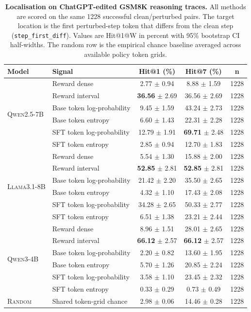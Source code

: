\begin{table}[t]
\centering
\small
\setlength{\tabcolsep}{5pt}
\caption{\textbf{Localisation on ChatGPT-edited GSM8K reasoning traces.} All methods are scored on the same 1228 successful clean/perturbed pairs. The target location is the first perturbed-step token that differs from the clean step (\texttt{step\_first\_diff}). Values are Hit@1@W in percent with 95\% bootstrap CI half-widths. The random row is the empirical chance baseline averaged across available policy token grids.}
\label{tab:localisation_chatgpt_step_combined_hit1_hit7}
\begin{tabular}{llccc}
\toprule
\textbf{Model} & \textbf{Signal} & \textbf{Hit@1 (\%)} & \textbf{Hit@7 (\%)} & \textbf{n} \\
\midrule
\multirow{6}{*}{\textsc{Qwen2.5-7B}} & Reward dense & 2.77 $\pm$ 0.94 & 8.88 $\pm$ 1.59 & 1228 \\
 & Reward interval & \textbf{36.56} $\pm$ 2.69 & 36.56 $\pm$ 2.69 & 1228 \\
 & Base token log-probability & 9.45 $\pm$ 1.59 & 43.24 $\pm$ 2.73 & 1228 \\
 & Base token entropy & 6.60 $\pm$ 1.43 & 22.31 $\pm$ 2.28 & 1228 \\
 & SFT token log-probability & 12.79 $\pm$ 1.91 & \textbf{69.71} $\pm$ 2.48 & 1228 \\
 & SFT token entropy & 2.85 $\pm$ 0.94 & 12.70 $\pm$ 1.83 & 1228 \\
\midrule
\multirow{6}{*}{\textsc{Llama3.1-8B}} & Reward dense & 5.54 $\pm$ 1.30 & 15.88 $\pm$ 2.00 & 1228 \\
 & Reward interval & \textbf{52.85} $\pm$ 2.81 & \textbf{52.85} $\pm$ 2.81 & 1228 \\
 & Base token log-probability & 21.42 $\pm$ 2.20 & 35.50 $\pm$ 2.65 & 1228 \\
 & Base token entropy & 4.32 $\pm$ 1.10 & 17.43 $\pm$ 2.08 & 1228 \\
 & SFT token log-probability & 34.28 $\pm$ 2.65 & 50.33 $\pm$ 2.77 & 1228 \\
 & SFT token entropy & 6.51 $\pm$ 1.38 & 23.21 $\pm$ 2.44 & 1228 \\
\midrule
\multirow{6}{*}{\textsc{Qwen3-4B}} & Reward dense & 8.96 $\pm$ 1.51 & 28.01 $\pm$ 2.65 & 1228 \\
 & Reward interval & \textbf{66.12} $\pm$ 2.57 & \textbf{66.12} $\pm$ 2.57 & 1228 \\
 & Base token log-probability & 2.20 $\pm$ 0.82 & 13.60 $\pm$ 1.95 & 1228 \\
 & Base token entropy & 5.70 $\pm$ 1.26 & 20.85 $\pm$ 2.24 & 1228 \\
 & SFT token log-probability & 3.58 $\pm$ 1.10 & 23.45 $\pm$ 2.32 & 1228 \\
 & SFT token entropy & 0.33 $\pm$ 0.29 & 0.73 $\pm$ 0.49 & 1228 \\
\midrule
\textsc{Random} & Shared token-grid chance & 2.98 $\pm$ 0.06 & 14.46 $\pm$ 0.28 & 1228 \\
\bottomrule
\end{tabular}
\end{table}
